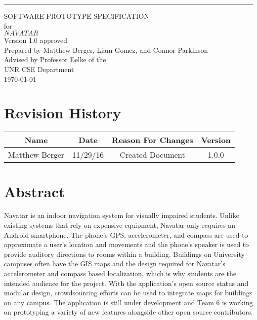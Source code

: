\documentclass{scrreprt}
\date{}
\def\myversion{1.0 }
\begin{document}
\begin{flushright}
    \rule{16cm}{5pt}\vskip1cm
    \begin{bfseries}
        \Huge{SOFTWARE PROTOTYPE SPECIFICATION}\\
        \vspace{1.6cm}
        for\\
        \vspace{1.6cm}
        $NAVATAR$\\
        \vspace{1.6cm}
        \LARGE{Version \myversion approved}\\
        \vspace{1.6cm}
        Prepared by Matthew Berger, Liam Gomez, and Connor Parkinson\\ 
        \vspace{1.6cm}
        Advised by Professor Eelke of the\\UNR CSE Department\\
        \vspace{1.6cm}
        \today\\
    \end{bfseries}
\end{flushright}

\tableofcontents

\chapter*{Revision History}

\begin{center}
    \begin{tabular}{|c|c|c|c|}
        \hline
	    Name & Date & Reason For Changes & Version\\
        \hline
	    Matthew Berger & 11/29/16 & Created Document & 1.0.0\\
        \hline
    \end{tabular}
\end{center}

\chapter{Abstract}
Navatar is an indoor navigation system for visually impaired students. Unlike existing systems that rely on expensive equipment, Navatar only requires an Android smartphone. The phone’s GPS, accelerometer, and compass are used to approximate a user's location and movements and the phone’s speaker is used to provide auditory directions to rooms within a building. Buildings on University campuses often have the GIS maps and the design required for Navatar’s accelerometer and compass based localization, which is why students are the intended audience for the project. With the application’s open source status and modular design, crowdsourcing efforts can be used to integrate maps for buildings on any campus. The application is still under development and Team 6 is working on prototyping a variety of new features alongside other open source contributors.
\end{document}
